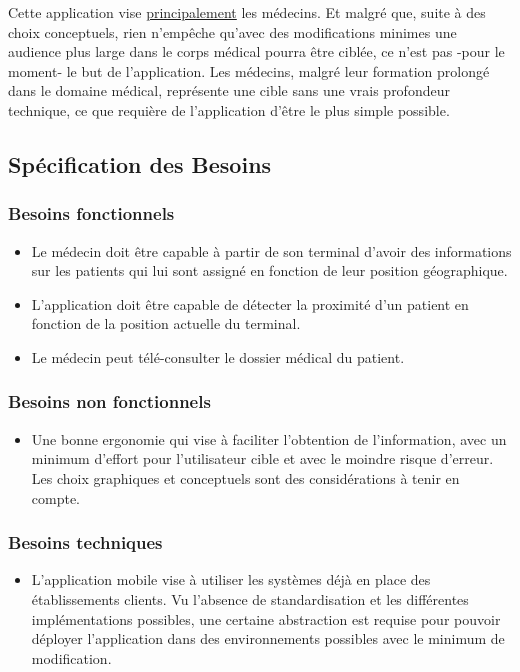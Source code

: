 Cette application vise \underline{principalement} les médecins. Et
malgré que, suite à des choix conceptuels, rien n’empêche qu’avec des
modifications minimes une audience plus large dans le corps médical
pourra être ciblée, ce n’est pas -pour le moment- le but de
l’application. Les médecins, malgré leur formation prolongé dans le
domaine médical, représente une cible sans une vrais profondeur
technique, ce que requière de l’application d’être le plus simple
possible.

\subsection{Spécification des Besoins}
\subsubsection{Besoins fonctionnels}
\begin{itemize}
\item Le médecin doit être capable à partir de son terminal d’avoir des informations sur les patients qui lui sont assigné en fonction de leur position géographique.

\item L'application doit être capable de détecter la proximité d'un
patient en fonction de la position actuelle du terminal.

\item Le médecin peut télé-consulter le dossier médical du patient.


\end{itemize}

\subsubsection{Besoins non fonctionnels}
\begin{itemize}

\item Une bonne ergonomie qui vise à faciliter l'obtention de
l'information, avec un minimum d'effort pour l'utilisateur cible et
avec le moindre risque d'erreur. Les choix graphiques et conceptuels
sont des considérations à tenir en compte.

\end{itemize}

\subsubsection{Besoins techniques}
\begin{itemize}

\item L’application mobile vise à utiliser les systèmes déjà en place des établissements clients. Vu l’absence de standardisation et les différentes implémentations possibles, une certaine abstraction est requise pour pouvoir déployer l’application dans des environnements possibles avec le minimum de modification.

\end{itemize}

